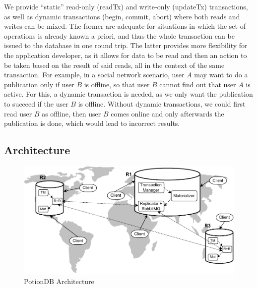 \documentclass[sigplan,10pt]{acmart}
\newcommand{\code}[1]{\textsf{\small{#1}}}
\newcommand{\carla}[1]{\nbnote{Carla}{green}{#1}}
\begin{document}
We provide ``static'' read-only (\code{readTx}) and write-only (\code{updateTx}) transactions, 
as well as dynamic transactions (\code{begin}, \code{commit}, \code{abort}) where both reads and writes can be mixed.
The former are adequate for situations in which the set of operations is already known a priori, and thus the whole transaction can be issued to the database in one round trip.
The latter provides more flexibility for the application developer, as it allows for data to be read and then an action to be taken based on the result of said reads, all in the context of the same transaction.
For example, in a social network scenario, user $A$ may want to do a publication only if user $B$ is offline, so that user $B$ cannot find out that user $A$ is active.
For this, a dynamic transaction is needed, as we only want the publication to succeed if the user $B$ is offline.
Without dynamic transactions, we could first read user $B$ as offline, then user $B$ comes online and only afterwards the publication is done, which would lead to incorrect results.

\subsection{Architecture}
\label{subsec:architecture}


\begin{figure}
	\centering
	\includegraphics[width=\linewidth]{PotionDBArch}
	\caption{PotionDB Architecture}
	\label{fig:arch}
\end{figure}
\end{document}
